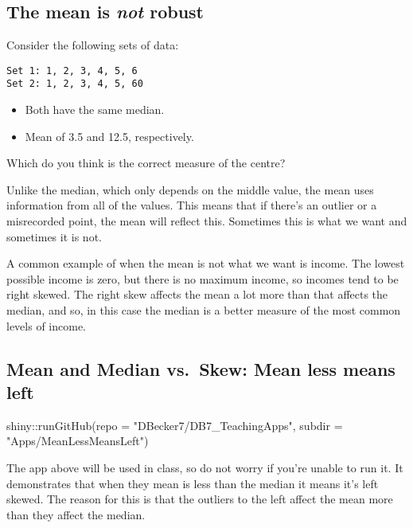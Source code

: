 \documentclass[
  letterpaper,
  DIV=11,
  numbers=noendperiod]{scrreprt}
\newenvironment{Shaded}{\begin{snugshade}}{\end{snugshade}}
\newcommand{\AttributeTok}[1]{\textcolor[rgb]{0.40,0.45,0.13}{#1}}
\newcommand{\FunctionTok}[1]{\textcolor[rgb]{0.28,0.35,0.67}{#1}}
\newcommand{\NormalTok}[1]{\textcolor[rgb]{0.00,0.23,0.31}{#1}}
\newcommand{\SpecialCharTok}[1]{\textcolor[rgb]{0.37,0.37,0.37}{#1}}
\newcommand{\StringTok}[1]{\textcolor[rgb]{0.13,0.47,0.30}{#1}}
\providecommand{\tightlist}{%
  \setlength{\itemsep}{0pt}\setlength{\parskip}{0pt}}\usepackage{longtable,booktabs,array}
\begin{document}
\hypertarget{the-mean-is-not-robust}{%
\subsection{\texorpdfstring{The mean is \emph{not}
robust}{The mean is not robust}}\label{the-mean-is-not-robust}}

Consider the following sets of data:

\begin{verbatim}
Set 1: 1, 2, 3, 4, 5, 6
Set 2: 1, 2, 3, 4, 5, 60
\end{verbatim}

\begin{itemize}
\tightlist
\item
  Both have the same median.
\item
  Mean of 3.5 and 12.5, respectively.
\end{itemize}

Which do you think is the correct measure of the centre?

Unlike the median, which only depends on the middle value, the mean uses
information from all of the values. This means that if there's an
outlier or a misrecorded point, the mean will reflect this. Sometimes
this is what we want and sometimes it is not.

A common example of when the mean is not what we want is income. The
lowest possible income is zero, but there is no maximum income, so
incomes tend to be right skewed. The right skew affects the mean a lot
more than that affects the median, and so, in this case the median is a
better measure of the most common levels of income.

\hypertarget{mean-and-median-vs.-skew-mean-less-means-left}{%
\subsection{Mean and Median vs.~Skew: Mean less means
left}\label{mean-and-median-vs.-skew-mean-less-means-left}}

\begin{Shaded}
\begin{Highlighting}[]
\NormalTok{shiny}\SpecialCharTok{::}\FunctionTok{runGitHub}\NormalTok{(}\AttributeTok{repo =} \StringTok{"DBecker7/DB7\_TeachingApps"}\NormalTok{, }
    \AttributeTok{subdir =} \StringTok{"Apps/MeanLessMeansLeft"}\NormalTok{)}
\end{Highlighting}
\end{Shaded}

The app above will be used in class, so do not worry if you're unable to
run it. It demonstrates that when they mean is less than the median it
means it's left skewed. The reason for this is that the outliers to the
left affect the mean more than they affect the median.
\end{document}

